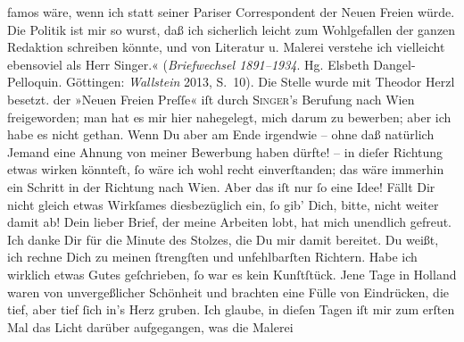 \begin{ledgroupsized}[t]{13cm}
{{{                        famos wäre, wenn ich statt seiner Pariser Correspondent der Neuen
                           Freien würde. Die Politik ist mir so wurst, daß ich sicherlich
                        leicht zum Wohlgefallen der ganzen Redaktion schreiben könnte, und von Literatur u.
                        Malerei verstehe ich vielleicht ebensoviel als Herr Singer.« (\emph{Briefwechsel 1891–1934}. Hg. Elsbeth Dangel-Pelloquin.
                     Göttingen: \emph{Wallstein} 2013, S. 10). Die Stelle
                  wurde mit Theodor Herzl besetzt.}}}\label{K_L02668-11h} der
                  »Neuen Freien Preſſe« iſt durch \textsc{Singer}’s Berufung nach {\pb}Wien freigeworden; man hat es mir hier nahegelegt,
               mich darum zu bewerben; aber ich habe es nicht gethan. Wenn Du aber am Ende irgendwie
               – ohne daß natürlich Jemand eine Ahnung von meiner Bewerbung haben dürfte! – in
               dieſer Richtung etwas wirken könnteſt, ſo wäre ich wohl recht einverſtanden; das wäre
               immerhin ein Schritt in der Richtung nach Wien.
               Aber das iſt nur ſo eine Idee! Fällt Dir nicht gleich etwas Wirkſames
                  diesbezüglich\strikeout{\textcolor{gray}{er}} ein, ſo gib’ Dich, bitte, nicht weiter damit ab! {\dotsfour}
               Dein lieber Brief, der meine Arbeiten lobt, hat mich unendlich gefreut. Ich danke Dir
               für die Minute des Stolzes, die Du mir damit bereitet. Du weißt, ich rechne Dich zu
               meinen ſtrengſten und unfehlbarſten Richtern. Habe ich wirklich etwas Gutes
               geſchrieben, ſo war es kein Kunſtſtück. Jene Tage in Holland waren von unvergeßlicher Schönheit und brachten eine Fülle von
               Eindrücken, die tief,  aber tief ſich in’s Herz gruben. Ich glaube, in
               dieſen Tagen iſt mir zum erſten Mal das Licht darüber aufgegangen, was die Malerei

\end{ledgroupsized}
